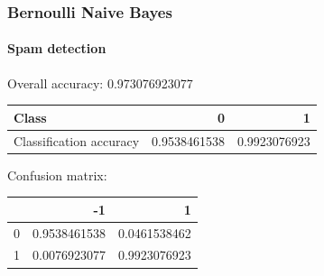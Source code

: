 \subsubsection{Bernoulli Naive Bayes}
\paragraph{Spam detection \\}
Overall accuracy: 0.973076923077

\begin{tabular}{l|r|r}
Class & 0 & 1 \\
\hline
Classification accuracy & 0.9538461538 & 0.9923076923 \\
\end{tabular}

Confusion matrix:

\begin{tabular}{l|r|r}
 & -1 & 1 \\
\hline
0 & 0.9538461538 & 0.0461538462 \\
1 & 0.0076923077 & 0.9923076923 \\
\end{tabular}

